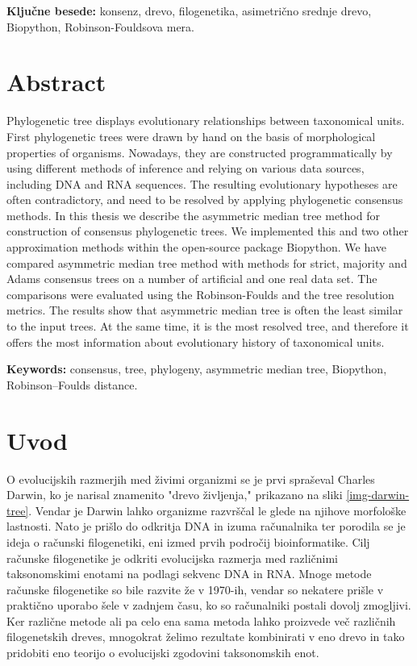 \documentclass[a4paper, 12pt]{book}
\newcommand{\tkeywords}{konsenz, drevo, filogenetika, asimetrično srednje drevo, Biopython, Robinson-Fouldsova mera}
\newcommand{\tkeywordsEn}{consensus, tree, phylogeny, asymmetric median tree, Biopython, Robinson–Foulds distance}
\newcommand{\clearemptydoublepage}{\newpage{\pagestyle{empty}\cleardoublepage}}
\begin{document}
\noindent\textbf{Ključne besede:} \tkeywords.
\clearemptydoublepage

\chapter*{Abstract}

Phylogenetic tree displays evolutionary relationships between taxonomical
units. First phylogenetic trees were drawn by hand on the basis of
morphological properties of organisms. Nowadays, they are constructed
programmatically by using different methods of inference and relying on
various data sources, including DNA and RNA sequences. The resulting
evolutionary hypotheses are often contradictory, and need to be resolved by
applying phylogenetic consensus methods. In this thesis we describe the
asymmetric median tree method for construction of consensus phylogenetic
trees. We implemented this and two other approximation methods within the
open-source package Biopython. We have compared asymmetric median tree
method with methods for strict, majority and Adams consensus trees on a
number of artificial and one real data set. The comparisons were evaluated
using the Robinson-Foulds and the tree resolution metrics. The results show
that asymmetric median tree is often the least similar to the input trees.
At the same time, it is the most resolved tree, and therefore it offers the
most information about evolutionary history of taxonomical units.

\bigskip

\noindent\textbf{Keywords:} \tkeywordsEn.
\clearemptydoublepage

\mainmatter
\setcounter{page}{1}
\pagestyle{fancy}

\chapter{Uvod}
O evolucijskih razmerjih med živimi organizmi se je prvi spraševal Charles Darwin,
ko je narisal znamenito "drevo življenja," prikazano na sliki \ref{img-darwin-tree}.
Vendar je Darwin lahko organizme razvrščal le glede na njihove morfološke lastnosti.
Nato je prišlo do odkritja DNA in izuma računalnika ter porodila se je ideja o računski
filogenetiki, eni izmed prvih področij bioinformatike. Cilj računske filogenetike je 
odkriti evolucijska razmerja med različnimi taksonomskimi enotami na podlagi sekvenc DNA in RNA.
Mnoge metode računske filogenetike so bile razvite že v 1970-ih, vendar so
nekatere prišle v praktično uporabo šele v zadnjem času, ko so računalniki postali dovolj zmogljivi.
Ker različne metode ali pa celo ena sama metoda lahko proizvede več 
različnih filogenetskih dreves, mnogokrat želimo rezultate kombinirati v eno drevo in 
tako pridobiti eno teorijo o evolucijski zgodovini taksonomskih enot. 
\end{document}
